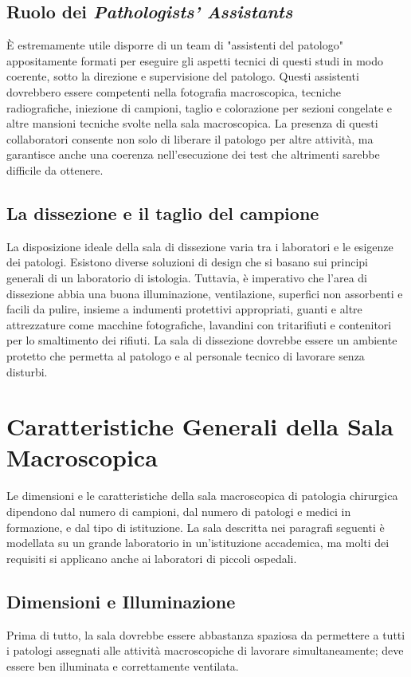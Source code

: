 \subsection{Ruolo dei \textit{Pathologists' Assistants}}
È estremamente utile disporre di un team di "assistenti del patologo" appositamente formati per eseguire gli aspetti tecnici di questi studi in modo coerente, sotto la direzione e supervisione del patologo. Questi assistenti dovrebbero essere competenti nella fotografia macroscopica, tecniche radiografiche, iniezione di campioni, taglio e colorazione per sezioni congelate e altre mansioni tecniche svolte nella sala macroscopica. La presenza di questi collaboratori consente non solo di liberare il patologo per altre attività, ma garantisce anche una coerenza nell'esecuzione dei test che altrimenti sarebbe difficile da ottenere.


\subsection{La dissezione e il taglio del campione}
La disposizione ideale della sala di dissezione varia tra i laboratori e le esigenze dei patologi. Esistono diverse soluzioni di design che si basano sui principi generali di un laboratorio di istologia. Tuttavia, è imperativo che l'area di dissezione abbia una buona illuminazione, ventilazione, superfici non assorbenti e facili da pulire, insieme a indumenti protettivi appropriati, guanti e altre attrezzature come macchine fotografiche, lavandini con tritarifiuti e contenitori per lo smaltimento dei rifiuti. La sala di dissezione dovrebbe essere un ambiente protetto che permetta al patologo e al personale tecnico di lavorare senza disturbi.

\section{Caratteristiche Generali della Sala Macroscopica}
Le dimensioni e le caratteristiche della sala macroscopica di patologia chirurgica dipendono dal numero di campioni, dal numero di patologi e medici in formazione, e dal tipo di istituzione. La sala descritta nei paragrafi seguenti è modellata su un grande laboratorio in un'istituzione accademica, ma molti dei requisiti si applicano anche ai laboratori di piccoli ospedali.

\subsection{Dimensioni e Illuminazione}
Prima di tutto, la sala dovrebbe essere abbastanza spaziosa da permettere a tutti i patologi assegnati alle attività macroscopiche di lavorare simultaneamente; deve essere ben illuminata e correttamente ventilata.

